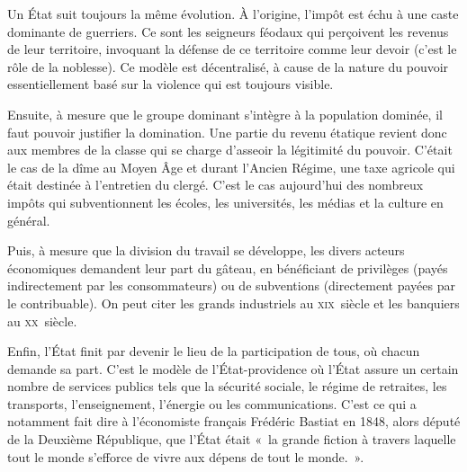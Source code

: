 
Un État suit toujours la même évolution. À l'origine, l'impôt est échu à une caste dominante de guerriers. Ce sont les seigneurs féodaux qui perçoivent les revenus de leur territoire, invoquant la défense de ce territoire comme leur devoir (c'est le rôle de la noblesse). Ce modèle est décentralisé, à cause de la nature du pouvoir essentiellement basé sur la violence qui est toujours visible.

Ensuite, à mesure que le groupe dominant s'intègre à la population dominée, il faut pouvoir justifier la domination. Une partie du revenu étatique revient donc aux membres de la classe qui se charge d'asseoir la légitimité du pouvoir. C'était le cas de la dîme au Moyen Âge et durant l'Ancien Régime, une taxe agricole qui était destinée à l'entretien du clergé. C'est le cas aujourd'hui des nombreux impôts qui subventionnent les écoles, les universités, les médias et la culture en général.

Puis, à mesure que la division du travail se développe, les divers acteurs économiques demandent leur part du gâteau, en bénéficiant de privilèges (payés indirectement par les consommateurs) ou de subventions (directement payées par le contribuable). On peut citer les grands industriels au \textsc{xix}\ieme{}~siècle et les banquiers au \textsc{xx}\ieme{}~siècle.


Enfin, l'État finit par devenir le lieu de la participation de tous, où chacun demande sa part. C'est le modèle de l'État-providence où l'État assure un certain nombre de services publics tels que la sécurité sociale, le régime de retraites, les transports, l'enseignement, l'énergie ou les communications. C'est ce qui a notamment fait dire à l'économiste français Frédéric Bastiat en 1848, alors député de la Deuxième République, que l'État était «~la grande fiction à travers laquelle tout le monde s'efforce de vivre aux dépens de tout le monde.~». %

